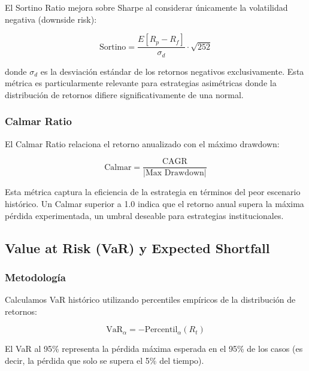 El Sortino Ratio \citep{sortino1991} mejora sobre Sharpe al considerar \'unicamente la volatilidad negativa (downside risk):

\begin{equation}
\text{Sortino} = \frac{E[R_p - R_f]}{\sigma_d} \cdot \sqrt{252}
\label{eq:sortino}
\end{equation}

donde $\sigma_d$ es la desviaci\'on est\'andar de los retornos negativos exclusivamente. Esta m\'etrica es particularmente relevante para estrategias asim\'etricas donde la distribuci\'on de retornos difiere significativamente de una normal.

\subsubsection{Calmar Ratio}

El Calmar Ratio relaciona el retorno anualizado con el m\'aximo drawdown:

\begin{equation}
\text{Calmar} = \frac{\text{CAGR}}{|\text{Max Drawdown}|}
\label{eq:calmar}
\end{equation}

Esta m\'etrica captura la eficiencia de la estrategia en t\'erminos del peor escenario hist\'orico. Un Calmar superior a 1.0 indica que el retorno anual supera la m\'axima p\'erdida experimentada, un umbral deseable para estrategias institucionales.

\subsection{Value at Risk (VaR) y Expected Shortfall}
\label{subsec:var_cvar}

\subsubsection{Metodolog\'ia}

Calculamos VaR hist\'orico utilizando percentiles emp\'iricos de la distribuci\'on de retornos:

\begin{equation}
\text{VaR}_{\alpha} = -\text{Percentil}_{\alpha}(R_t)
\label{eq:var}
\end{equation}

El VaR al 95\% representa la p\'erdida m\'axima esperada en el 95\% de los casos (es decir, la p\'erdida que solo se supera el 5\% del tiempo).

